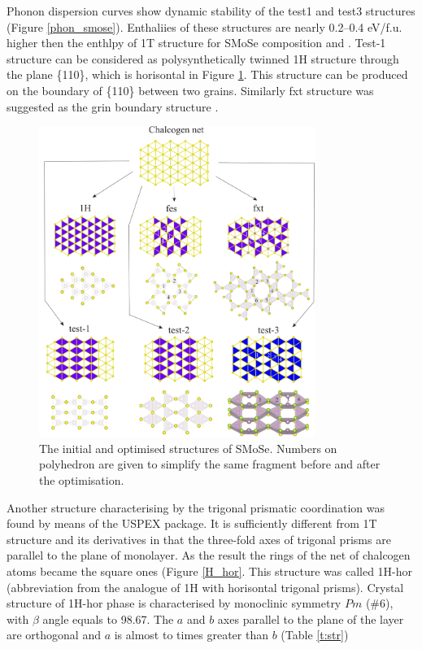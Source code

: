 \documentclass[a4paperm]{article}
\begin{document}
Phonon dispersion curves show dynamic stability of the test1 and test3 structures (Figure \ref{phon_smose}).
Enthaliies of these structures are nearly 0.2--0.4 eV/f.u. higher then the enthlpy of 1T structure for SMoSe composition and .
Test-1 structure can be considered as polysynthetically twinned 1H structure through the plane \{110\}, which is horisontal in Figure \ref{H-based}.
This structure can be produced on the boundary of \{110\} between two grains.
Similarly fxt structure was suggested as the grin boundary structure \cite{}.

\begin{figure}[H] \centering
        \includegraphics[width=0.8\textwidth]{H-based.png}
        \caption{The initial and optimised structures of SMoSe. Numbers on polyhedron are given to simplify the same fragment before and after the optimisation.}
\label{H-based}
\end{figure}


Another structure characterising by the trigonal prismatic coordination was found by means of the USPEX package.
It is sufficiently different from 1T structure and its derivatives in that the three-fold axes of trigonal prisms are parallel to the plane of monolayer.
As the result the rings of the net of chalcogen atoms became the square ones (Figure \ref{H_hor}.
This structure was called 1H-hor (abbreviation from the analogue of 1H with horisontal trigonal prisms).
Crystal structure of 1H-hor phase is characterised by monoclinic symmetry $Pm$ (\#6), with $\beta$ angle equals to 98.67\textdegree.
The $a$ and $b$ axes parallel to the plane of the layer are orthogonal and $a$ is almost to times greater than $b$ (Table \ref{t:str})
\end{document}
